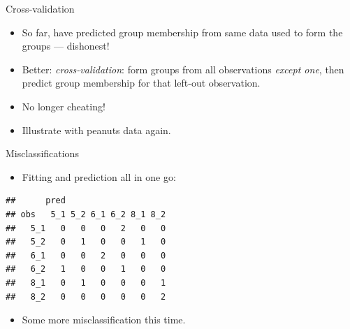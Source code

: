 \documentclass[ignorenonframetext,]{beamer}
\newenvironment{Shaded}{\begin{snugshade}}{\end{snugshade}}
\newcommand{\DataTypeTok}[1]{\textcolor[rgb]{0.13,0.29,0.53}{#1}}
\newcommand{\KeywordTok}[1]{\textcolor[rgb]{0.13,0.29,0.53}{\textbf{#1}}}
\newcommand{\NormalTok}[1]{#1}
\newcommand{\OperatorTok}[1]{\textcolor[rgb]{0.81,0.36,0.00}{\textbf{#1}}}
\newcommand{\StringTok}[1]{\textcolor[rgb]{0.31,0.60,0.02}{#1}}
\providecommand{\tightlist}{%
  \setlength{\itemsep}{0pt}\setlength{\parskip}{0pt}}
\begin{document}
\begin{frame}{Cross-validation}
\protect\hypertarget{cross-validation}{}

\begin{itemize}
\item
  So far, have predicted group membership from same data used to form
  the groups --- dishonest!
\item
  Better: \emph{cross-validation}: form groups from all observations
  \emph{except one}, then predict group membership for that left-out
  observation.
\item
  No longer cheating!
\item
  Illustrate with peanuts data again.
\end{itemize}

\end{frame}

\begin{frame}[fragile]{Misclassifications}
\protect\hypertarget{misclassifications}{}

\begin{itemize}
\tightlist
\item
  Fitting and prediction all in one go:
\end{itemize}

\small

\begin{Shaded}
\end{Shaded}

\begin{verbatim}
##      pred
## obs   5_1 5_2 6_1 6_2 8_1 8_2
##   5_1   0   0   0   2   0   0
##   5_2   0   1   0   0   1   0
##   6_1   0   0   2   0   0   0
##   6_2   1   0   0   1   0   0
##   8_1   0   1   0   0   0   1
##   8_2   0   0   0   0   0   2
\end{verbatim}

\normalsize

\begin{itemize}
\tightlist
\item
  Some more misclassification this time.
\end{itemize}

\end{frame}
\end{document}
